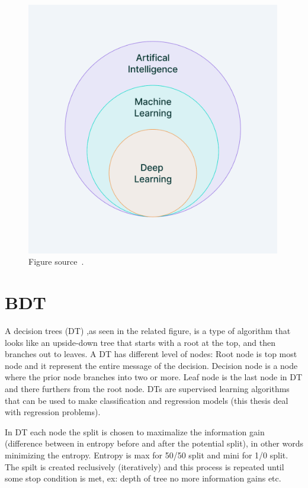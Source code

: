 \begin{figure}[t!]
\centering
\includegraphics[width=0.99\textwidth]{figures/ML_diagram.png}
\caption[ML and AI]{Figure source~\cite{SMtable}.}
\label{fig:ML_diagram}
\end{figure}
  
\section{BDT}
A decision trees (DT) ,as seen in the related figure, is a type of algorithm that looks like an upside-down tree that starts with a root at the top, and then branches out to leaves. A DT has different level of nodes: Root node is top most node and it represent the entire message of the decision. Decision node is a node where the prior node branches into two or more. Leaf node is the last node in DT and there furthers from the root node. DTs are supervised learning algorithms that can be used to make classification and regression models (this thesis deal with regression problems).

In DT each node the split is chosen to maximalize the information gain (difference between in entropy before and after the potential split), in other words minimizing the entropy. Entropy is max for 50/50 split and mini for 1/0 split. The spilt is created reclusively (iteratively) and this process is repeated until some stop condition is met, ex: depth of tree no more information gains etc.

